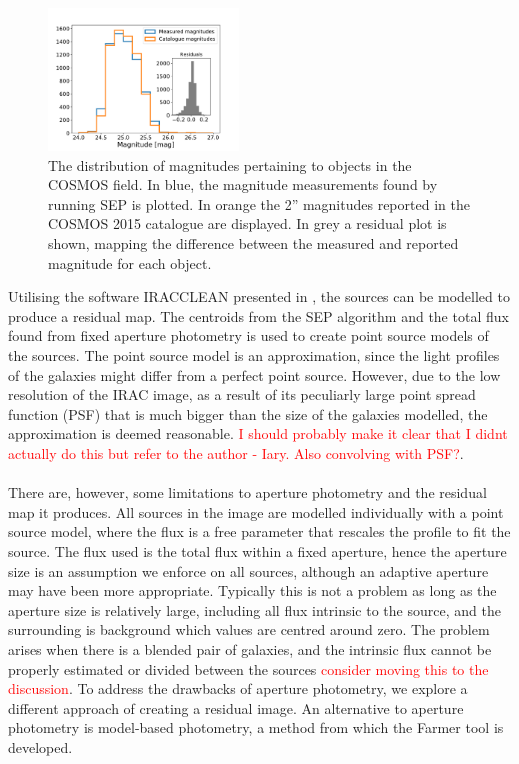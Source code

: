 \begin{figure}
    \centering %
    \includegraphics[trim={0.5cm 0 2cm 1.8cm},clip,width=0.45\textwidth]{Code/Saved_Figures/Mag_hist.pdf}
    \caption{The distribution of magnitudes pertaining to objects in the COSMOS field. In blue, the magnitude measurements found by running SEP is plotted. In orange the 2'' magnitudes reported in the COSMOS 2015 catalogue are displayed. In grey a residual plot is shown, mapping the difference between the measured and reported magnitude for each object.}
    \label{mag_hist}  
\end{figure}

Utilising the software IRACCLEAN presented in \cite{Hsieh_2012_IRACCLEAN}, the sources can be modelled to produce a residual map. The centroids from the SEP algorithm and the total flux found from fixed aperture photometry is used to create point source models of the sources. The point source model is an approximation, since the light profiles of the galaxies might differ from a perfect point source. However, due to the low resolution of the IRAC image, as a result of its peculiarly large point spread function (PSF) that is much bigger than the size of the galaxies modelled, the approximation is deemed reasonable. \textcolor{red}{I should probably make it clear that I didnt actually do this but refer to the author - Iary. Also convolving with PSF?}. \\ \\
There are, however, some limitations to aperture photometry and the residual map it produces. All sources in the image are modelled individually with a point source model, where the flux is a free parameter that rescales the profile to fit the source. The flux used is the total flux within a fixed aperture, hence the aperture size is an assumption we enforce on all sources, although an adaptive aperture may have been more appropriate. Typically this is not a problem as long as the aperture size is relatively large, including all flux intrinsic to the source, and the surrounding is background which values are centred around zero. The problem arises when there is a  blended pair of galaxies, and the intrinsic flux cannot be properly estimated or divided between the sources \textcolor{red}{consider moving this to the discussion}. To address the drawbacks of aperture photometry, we explore a different approach of creating a residual image. An alternative to aperture photometry is model-based photometry, a method from which the Farmer tool is developed. \\

